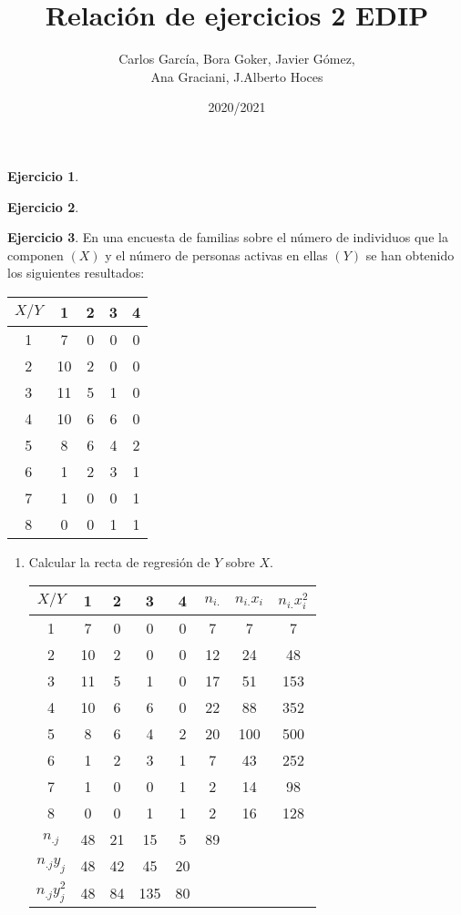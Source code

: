 \documentclass[a4paper, 12pt]{article}
\title{\textbf{Relación de ejercicios 2 EDIP}}
\author{Carlos García, Bora Goker, Javier Gómez,  \\ Ana Graciani, J.Alberto Hoces}
\date{2020/2021}
\theoremstyle{definition}
\newtheorem{ej}{Ejercicio}
\begin{document}
\maketitle

\begin{ej}

\end{ej}

\begin{ej}

\end{ej}

\begin{ej}
En una encuesta de familias sobre el número de individuos que la componen \((X)\) y el número de personas activas en ellas \((Y)\) se han obtenido los siguientes resultados:
\begin{center}
\begin{tabular}{c|cccc}
	\(X/Y\) & 1 & 2 & 3 & 4 \\
	\hline
	1 & 7 & 0 & 0 & 0 \\
	2 & 10 & 2 & 0 & 0 \\
	3 & 11 & 5 & 1 & 0 \\
	4 & 10 & 6 & 6 & 0 \\
	5 & 8 & 6 & 4 & 2 \\
	6 & 1 & 2 & 3 & 1 \\
	7 & 1 & 0 & 0 & 1 \\
	8 & 0 & 0 & 1 & 1
\end{tabular}
\end{center}

\begin{enumerate}[label=\alph*)]
	\item Calcular la recta de regresión de \(Y\) sobre \(X\).
	\begin{center}
	\begin{tabular}{c|c c c c c c c}
	\(X/Y\) & 1 & 2 & 3 & 4 & \(n_{i.}\) & \(n_{i.}x_i\) & \(n_{i.}x_i^2\) \\
	\hline
	1 & 7 & 0 & 0 & 0 & 7 & 7 & 7 \\
	2 & 10 & 2 & 0 & 0 & 12 & 24 & 48 \\
	3 & 11 & 5 & 1 & 0 & 17 & 51 & 153 \\
	4 & 10 & 6 & 6 & 0 & 22 & 88 & 352 \\
	5 & 8 & 6 & 4 & 2 & 20 & 100 & 500 \\
	6 & 1 & 2 & 3 & 1 & 7 & 43 & 252 \\
	7 & 1 & 0 & 0 & 1 & 2 & 14 & 98 \\
	8 & 0 & 0 & 1 & 1 & 2 & 16 & 128 \\
	\(n_{.j}\) & 48 & 21 & 15 & 5 & 89 \\
	\(n_{.j} y_j\) & 48 & 42 & 45 & 20 \\
	\(n_{.j} y_j^2\) & 48 & 84 & 135 & 80 \\
	\end{tabular}
	\end{center}
	

\end{enumerate}
\end{ej}
\end{document}
